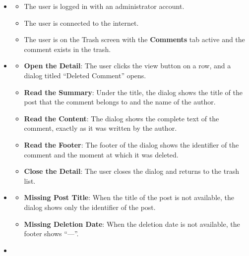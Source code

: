 \begin{itemize}[leftmargin=1.6em,topsep=4pt,itemsep=3pt,parsep=0pt,label=$\bullet$]
    \item {}
        \begin{itemize}[leftmargin=2.2em,topsep=2pt,itemsep=3pt,parsep=0pt,label=$\circ$]
            \item The user is logged in with an administrator account.
            \item The user is connected to the internet.
            \item The user is on the Trash screen with the \textbf{Comments} tab active and the comment exists in the trash.
        \end{itemize}
    \item {}
        \begin{itemize}[leftmargin=2.2em,topsep=2pt,itemsep=3pt,parsep=0pt,label=$\circ$]
            \item \textbf{Open the Detail}: The user clicks the view button on a row, and a dialog titled ``Deleted Comment'' opens.
            \item \textbf{Read the Summary}: Under the title, the dialog shows the title of the post that the comment belongs to and the name of the author.
            \item \textbf{Read the Content}: The dialog shows the complete text of the comment, exactly as it was written by the author.
            \item \textbf{Read the Footer}: The footer of the dialog shows the identifier of the comment and the moment at which it was deleted.
            \item \textbf{Close the Detail}: The user closes the dialog and returns to the trash list.
        \end{itemize}
    \item {}
        \begin{itemize}[leftmargin=2.2em,topsep=2pt,itemsep=3pt,parsep=0pt,label=$\circ$]
            \item \textbf{Missing Post Title}: When the title of the post is not available, the dialog shows only the identifier of the post.
            \item \textbf{Missing Deletion Date}: When the deletion date is not available, the footer shows ``---''.
        \end{itemize}
    \item {}

\end{itemize}
